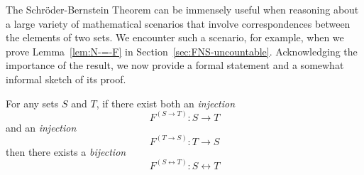 \bigskip 

The Schr\"{o}der-Bernstein Theorem can be immensely useful when reasoning about a large variety of mathematical scenarios that involve correspondences between the elements of two sets.  We encounter such a scenario, for example, when we prove Lemma~\ref{lem:N-=-F} in Section~\ref{sec:FNS-uncountable}.  Acknowledging the importance of the result, we now provide a formal statement and a somewhat informal sketch of its proof.

\begin{theorem}
\label{thm.S-B}
For any sets $S$ and $T$, if there exist both an {\em injection}
\[ F^{(S \rightarrow T)}: S \rightarrow T \]
and an {\em injection}
\[ F^{(T \rightarrow S)}: T \rightarrow S \]
then there exists a {\em bijection}
\[ F^{(S \leftrightarrow T)}: S \leftrightarrow T \]
\end{theorem}

